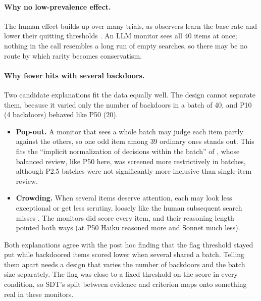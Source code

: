\documentclass[letterpaper]{article} %
\begin{document}
\paragraph{Why no low-prevalence effect.} The human effect builds up over many trials, as observers learn the base rate and lower their quitting thresholds \citep{wolfe2005,wolfe2007}. An LLM monitor sees all 40 items at once; nothing in the call resembles a long run of empty searches, so there may be no route by which rarity becomes conservatism.

\paragraph{Why fewer hits with several backdoors.} Two candidate explanations fit the data equally well. The design cannot separate them, because it varied only the number of backdoors in a batch of 40, and P10 (4 backdoors) behaved like P50 (20).
\begin{itemize}
\item \textbf{Pop-out.} A monitor that sees a whole batch may judge each item partly against the others, so one odd item among 39 ordinary ones stands out. This fits the ``implicit normalization of decisions within the batch'' of \citet{hida2026}, whose balanced review, like P50 here, was screened more restrictively in batches, although P2.5 batches were not significantly more inclusive than single-item review.
\item \textbf{Crowding.} When several items deserve attention, each may look less exceptional or get less scrutiny, loosely like the human subsequent search misses \citep{cain2013}. The monitors did score every item, and their reasoning length pointed both ways (at P50 Haiku reasoned more and Sonnet much less).
\end{itemize}
Both explanations agree with the post hoc finding that the flag threshold stayed put while backdoored items scored lower when several shared a batch. Telling them apart needs a design that varies the number of backdoors and the batch size separately. The flag was close to a fixed threshold on the score in every condition, so SDT's split between evidence and criterion maps onto something real in these monitors.
\end{document}

